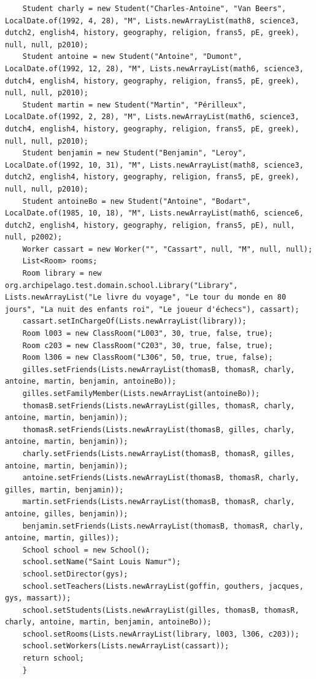\documentclass[a4paper,fleqn,12pt,oneside]{book}
\begin{document}
\begin{lstlisting}
    Student charly = new Student("Charles-Antoine", "Van Beers", LocalDate.of(1992, 4, 28), "M", Lists.newArrayList(math8, science3, dutch2, english4, history, geography, religion, frans5, pE, greek), null, null, p2010);
    Student antoine = new Student("Antoine", "Dumont", LocalDate.of(1992, 12, 28), "M", Lists.newArrayList(math6, science3, dutch4, english4, history, geography, religion, frans5, pE, greek), null, null, p2010);
    Student martin = new Student("Martin", "Périlleux", LocalDate.of(1992, 2, 28), "M", Lists.newArrayList(math6, science3, dutch4, english4, history, geography, religion, frans5, pE, greek), null, null, p2010);
    Student benjamin = new Student("Benjamin", "Leroy", LocalDate.of(1992, 10, 31), "M", Lists.newArrayList(math8, science3, dutch2, english4, history, geography, religion, frans5, pE, greek), null, null, p2010);
    Student antoineBo = new Student("Antoine", "Bodart", LocalDate.of(1985, 10, 18), "M", Lists.newArrayList(math6, science6, dutch2, english4, history, geography, religion, frans5, pE), null, null, p2002);
    Worker cassart = new Worker("", "Cassart", null, "M", null, null);
    List<Room> rooms;
    Room library = new org.archipelago.test.domain.school.Library("Library", Lists.newArrayList("Le livre du voyage", "Le tour du monde en 80 jours", "La nuit des enfants roi", "Le joueur d'échecs"), cassart);
    cassart.setInChargeOf(Lists.newArrayList(library));
    Room l003 = new ClassRoom("L003", 30, true, false, true);
    Room c203 = new ClassRoom("C203", 30, true, false, true);
    Room l306 = new ClassRoom("L306", 50, true, true, false);
    gilles.setFriends(Lists.newArrayList(thomasB, thomasR, charly, antoine, martin, benjamin, antoineBo));
    gilles.setFamilyMember(Lists.newArrayList(antoineBo));
    thomasB.setFriends(Lists.newArrayList(gilles, thomasR, charly, antoine, martin, benjamin));
    thomasR.setFriends(Lists.newArrayList(thomasB, gilles, charly, antoine, martin, benjamin));
    charly.setFriends(Lists.newArrayList(thomasB, thomasR, gilles, antoine, martin, benjamin));
    antoine.setFriends(Lists.newArrayList(thomasB, thomasR, charly, gilles, martin, benjamin));
    martin.setFriends(Lists.newArrayList(thomasB, thomasR, charly, antoine, gilles, benjamin));
    benjamin.setFriends(Lists.newArrayList(thomasB, thomasR, charly, antoine, martin, gilles));
    School school = new School();
    school.setName("Saint Louis Namur");
    school.setDirector(gys);
    school.setTeachers(Lists.newArrayList(goffin, gouthers, jacques, gys, massart));
    school.setStudents(Lists.newArrayList(gilles, thomasB, thomasR, charly, antoine, martin, benjamin, antoineBo));
    school.setRooms(Lists.newArrayList(library, l003, l306, c203));
    school.setWorkers(Lists.newArrayList(cassart));
    return school;
    }
\end{lstlisting}
\label{SchoolObj}
\end{document}

